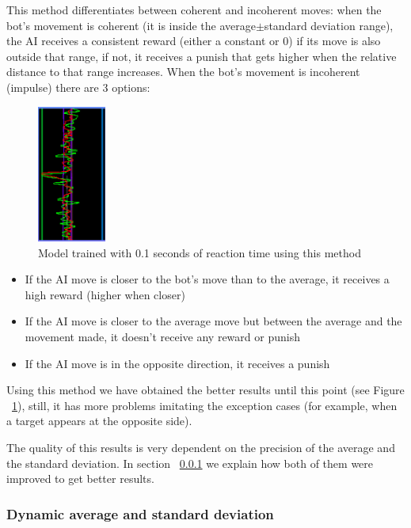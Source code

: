This method differentiates between coherent and incoherent moves: when the bot's movement is coherent (it is inside the average$\pm$standard deviation range), the AI receives a consistent reward (either a constant or 0) if its move is also outside that range, if not, it receives a punish that gets higher when the relative distance to that range increases. When the bot's movement is incoherent (impulse) there are 3 options:

\begin{figure}
    \centering
    \includegraphics[width=0.2\textwidth]{img/graphRTstd.png}
		\caption{Model trained with 0.1 seconds of reaction time using this method}
		\label{fig:graphRTstd}
\end{figure}

\begin{itemize}
 \item If the AI move is closer to the bot's move than to the average, it receives a high reward (higher when closer)
 \item If the AI move is closer to the average move but between the average and the movement made, it doesn't receive any reward or punish
 \item If the AI move is in the opposite direction, it receives a punish
\end{itemize}

Using this method we have obtained the better results until this point (see Figure ~\ref{fig:graphRTstd}), still, it has more problems imitating the exception cases (for example, when a target appears at the opposite side). 

The quality of this results is very dependent on the precision of the average and the standard deviation. In section ~\ref{sec:dynamicstd} we explain how both of them were improved to get better results.

\subsubsection{Dynamic average and standard deviation}
\label{sec:dynamicstd}

